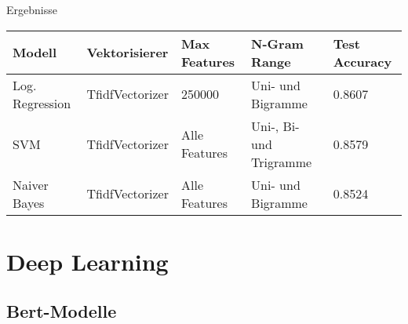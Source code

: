 \documentclass[aspectratio=169]{beamer} %
\begin{document}
\begin{frame}{Ergebnisse}
    \centering
    \scriptsize


    \begin{tabular}{|l|l|l|l|l|}
        \hline
        \textbf{Modell} & \textbf{Vektorisierer} & \textbf{Max Features} & \textbf{N-Gram Range} & \textbf{Test Accuracy} \\
        \hline
        Log. Regression & TfidfVectorizer & 250000 & Uni- und Bigramme & 0.8607 \\
        SVM & TfidfVectorizer & Alle Features & Uni-, Bi- und Trigramme & 0.8579 \\
        Naiver Bayes & TfidfVectorizer & Alle Features & Uni- und Bigramme & 0.8524 \\
        \hline
    \end{tabular}
\end{frame}


\section{Deep Learning}

\subsection{Bert-Modelle}
\end{document}

